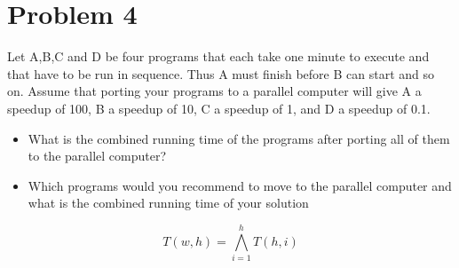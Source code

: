 \documentclass{article}
\begin{document}
\section{Problem 4}
Let A,B,C and D be four programs that each take one minute to execute and that have to be run in sequence. Thus A must finish before B can start and so on. Assume that porting your programs to a parallel computer will give A a speedup of 100, B a speedup of 10, C a speedup of 1, and D a speedup of 0.1.

\begin{itemize}
    \item What is the combined running time of the programs after porting all of them to the parallel computer?
    \item Which programs would you recommend to move to the parallel computer and what is the combined running time of your solution
\end{itemize}

\medskip

\begin{center}
\end{center}
\medskip


\[ T\left( w,h \right) = \bigwedge_{i=1}^{h}T(h,i) \]
\end{document}
